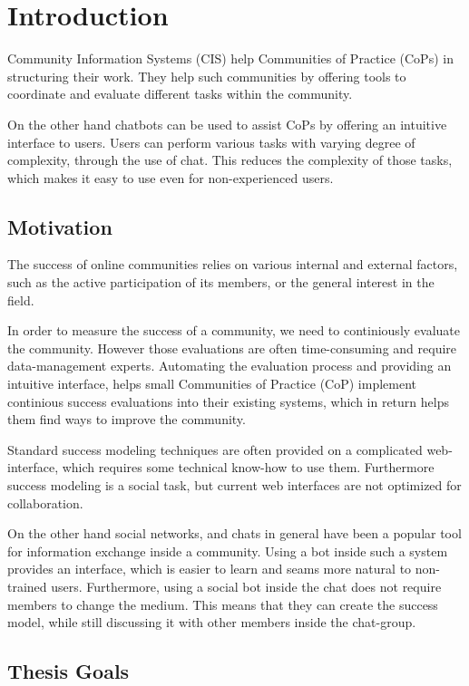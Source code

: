 \chapter{Introduction}
Community Information Systems (CIS) help Communities of Practice (CoPs) in structuring their work. They help such communities by offering tools to coordinate and evaluate different tasks within the community.

On the other hand chatbots can be used to assist CoPs by offering an intuitive interface to users. Users can perform various tasks with varying degree of complexity, through the use of chat. This reduces the complexity of those tasks, which makes it easy to use even for non-experienced users.

\section{Motivation}
The success of online communities relies on various internal and external factors, such as the active participation of its members, or the general interest in the field.

In order to measure the success of a community, we need to continiously evaluate the community. However those evaluations are often time-consuming and require data-management experts. Automating the evaluation process and providing an intuitive interface, helps small Communities of Practice (CoP) implement continious success evaluations into their existing systems, which in return helps them find ways to improve the community.

Standard success modeling techniques are often provided on a complicated web-interface, which requires some technical know-how to use them. Furthermore success modeling is a social task, but current web interfaces are not optimized for collaboration.

On the other hand social networks, and chats in general have been a popular tool for information exchange inside a community. Using a bot inside such a system provides an interface, which is easier to learn and seams more natural to non-trained users. Furthermore, using a social bot inside the chat does not require members to change the medium. This means that they can create the success model, while still discussing it with other members inside the chat-group.

\newpage

\section{Thesis Goals}

\blankpage
